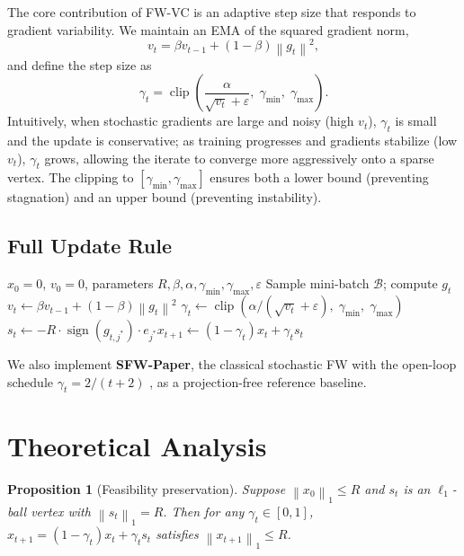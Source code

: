 \documentclass[10pt,twocolumn]{article}
\newtheorem{proposition}{Proposition}
\newcommand{\norm}[1]{\left\|#1\right\|}
\newcommand{\clip}{\operatorname{clip}}
\begin{document}
The core contribution of FW-VC is an adaptive step size that responds to
gradient variability. We maintain an EMA of the squared gradient norm,
\[
  v_t = \beta v_{t-1} + (1-\beta)\norm{g_t}^2,
\]
and define the step size as
\[
  \gamma_t = \clip\!\left(\frac{\alpha}{\sqrt{v_t} + \varepsilon},\;
             \gamma_{\min},\; \gamma_{\max}\right).
\]
Intuitively, when stochastic gradients are large and noisy (high $v_t$),
$\gamma_t$ is small and the update is conservative; as training progresses
and gradients stabilize (low $v_t$), $\gamma_t$ grows, allowing the iterate
to converge more aggressively onto a sparse vertex. The clipping to
$[\gamma_{\min}, \gamma_{\max}]$ ensures both a lower bound (preventing
stagnation) and an upper bound (preventing instability).

\subsection{Full Update Rule}

\begin{algorithm}[H]
\caption{FW-VC: Frank-Wolfe with Variance-Controlled Step Size}
\label{alg:fwvc}
\begin{algorithmic}[1]
\Require $x_0 = 0$, $v_0 = 0$, parameters $R, \beta, \alpha, \gamma_{\min}, \gamma_{\max}, \varepsilon$
  \State Sample mini-batch $\mathcal{B}$; compute $g_t$
  \State $v_t \leftarrow \beta v_{t-1} + (1-\beta)\norm{g_t}^2$
  \State $\gamma_t \leftarrow \clip\!\left(\alpha/(\sqrt{v_t}+\varepsilon),\; \gamma_{\min},\; \gamma_{\max}\right)$
  \State $s_t \leftarrow -R \cdot \operatorname{sign}(g_{t,j^*}) \cdot e_{j^*}$\quad
         [$j^* = \arg\max_i|g_{t,i}|$]
  \State $x_{t+1} \leftarrow (1-\gamma_t)x_t + \gamma_t s_t$
\EndFor
\end{algorithmic}
\end{algorithm}

We also implement \textbf{SFW-Paper}, the classical stochastic FW with the
open-loop schedule $\gamma_t = 2/(t+2)$ \cite{jaggi2013}, as a
projection-free reference baseline.

\section{Theoretical Analysis}
\label{sec:theory}

\begin{proposition}[Feasibility preservation]
\label{prop:feasibility}
Suppose $\norm{x_0}_1 \leq R$ and $s_t$ is an $\ell_1$-ball vertex
with $\norm{s_t}_1 = R$. Then for any $\gamma_t \in [0,1]$,
$x_{t+1} = (1-\gamma_t)x_t + \gamma_t s_t$ satisfies
$\norm{x_{t+1}}_1 \leq R$.
\end{proposition}
\end{document}
